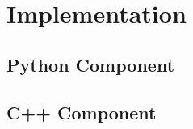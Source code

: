 \section{Implementation}\label{s:implementation}

\begin{figure*}[ht!]
    
    \label{fig:main_interface}
\end{figure*}

\subsection{Python Component}

\subsection{C++ Component}

\lipsum[1-6]


